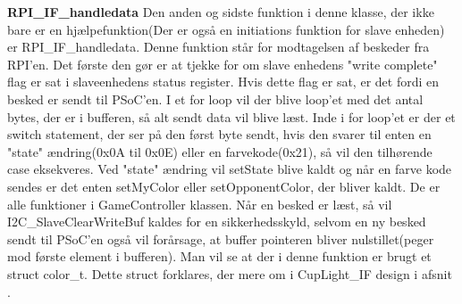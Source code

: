 \documentclass[Softwaredesign/Softwaredesign_main.tex]{subfiles}
\begin{document}
\textbf{RPI\_IF\_handledata}
Den anden og sidste funktion i denne klasse, der ikke bare er en hjælpefunktion(Der er også en initiations funktion for slave enheden) er RPI\_IF\_handledata. Denne funktion står for modtagelsen af beskeder fra RPI'en. Det første den gør er at tjekke for om slave enhedens "write complete" flag er sat i slaveenhedens status register. Hvis dette flag er sat, er det fordi en besked er sendt til PSoC'en. I et for loop vil der blive loop'et med det antal bytes, der er i bufferen, så alt sendt data vil blive læst. Inde i for loop'et er der et switch statement, der ser på den først byte sendt, hvis den svarer til enten en "state" ændring(0x0A til 0x0E) eller en farvekode(0x21), så vil den tilhørende case eksekveres. Ved "state" ændring vil setState blive kaldt og når en farve kode sendes er det enten setMyColor eller setOpponentColor, der bliver kaldt. De er alle funktioner i GameController klassen. Når en besked er læst, så vil I2C\_SlaveClearWriteBuf kaldes for en sikkerhedsskyld, selvom en ny besked sendt til PSoC'en også vil forårsage, at buffer pointeren bliver nulstillet(peger mod første element i bufferen). Man vil se at der i denne funktion er brugt et struct color\_t. Dette struct forklares, der mere om i CupLight\_IF design i afsnit .
\end{document}
